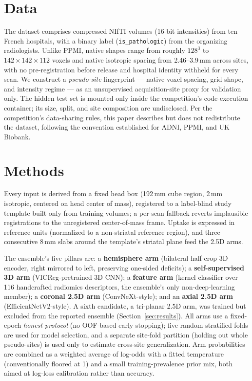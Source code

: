 \documentclass{article}
\begin{document}
\section{Data}
\label{sec:data}

The dataset comprises compressed NIfTI volumes (16-bit intensities) from ten French hospitals, with a binary label (\texttt{is\_pathologic}) from the organizing radiologists. Unlike PPMI, native shapes range from roughly $128^3$ to $142\times142\times112$ voxels and native isotropic spacing from 2.46--3.9\,mm across sites, with no pre-registration before release and hospital identity withheld for every scan. We construct a \emph{pseudo-site} fingerprint --- native voxel spacing, grid shape, and intensity regime --- as an unsupervised acquisition-site proxy for validation only. The hidden test set is mounted only inside the competition's code-execution container; its size, split, and site composition are undisclosed. Per the competition's data-sharing rules, this paper describes but does not redistribute the dataset, following the convention established for ADNI, PPMI, and UK Biobank.

\section{Methods}
\label{sec:methods}

Every input is derived from a fixed head box (192\,mm cube region, 2\,mm isotropic, centered on head center of mass), registered to a label-blind study template built only from training volumes; a per-scan fallback reverts implausible registrations to the unregistered center-of-mass frame. Uptake is expressed in reference units (normalized to a non-striatal reference region), and three consecutive 8\,mm slabs around the template's striatal plane feed the 2.5D arms.

The ensemble's five pillars are: a \textbf{hemisphere arm} (bilateral half-crop 3D encoder, right mirrored to left, preserving one-sided deficits); a \textbf{self-supervised 3D arm} (VICReg-pretrained 3D CNN); a \textbf{feature arm} (kernel classifier over 116 handcrafted radiomics descriptors, the ensemble's only non-deep-learning member); a \textbf{coronal 2.5D arm} (ConvNeXt-style); and an \textbf{axial 2.5D arm} (EfficientNetV2-style). A sixth candidate, a tri-planar 2.5D arm, was trained but excluded from the reported ensemble (Section~\ref{sec:results}). All arms use a fixed-epoch \emph{honest protocol} (no OOF-based early stopping); five random stratified folds are used for model selection, and a separate site-fold partition (holding out whole pseudo-sites) is used only to estimate cross-site generalization. Arm probabilities are combined as a weighted average of log-odds with a fitted temperature (conventionally floored at 1) and a small training-prevalence prior mix, both aimed at log-loss calibration rather than accuracy.
\end{document}
